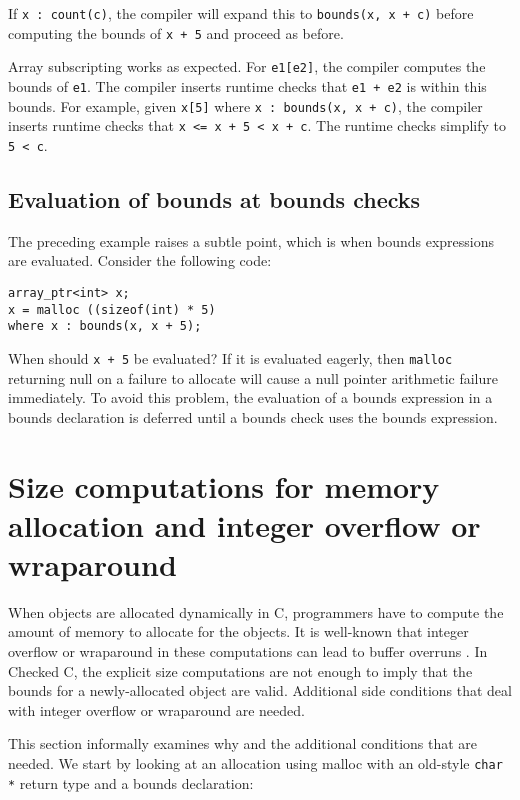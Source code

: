 If \verb|x : count(c)|, the compiler will expand this to
\verb|bounds(x, x + c)| before computing the bounds of \verb|x + 5|
and proceed as before.

Array subscripting works as expected. For \texttt{e1[e2]}, the
compiler computes the bounds of \texttt{e1}. The compiler inserts
runtime checks that \texttt{e1 + e2} is within this bounds. For example,
given \verb|x[5]| where \verb|x : bounds(x, x + c)|, the
compiler inserts runtime checks that \verb|x <= x + 5 < x + c|. 
The runtime checks simplify to \verb|5 < c|.

\subsection{Evaluation of bounds at bounds checks}

The preceding example raises a subtle point, which is when bounds
expressions are evaluated. Consider the following code:

\begin{verbatim}
array_ptr<int> x;
x = malloc ((sizeof(int) * 5)
where x : bounds(x, x + 5);
\end{verbatim}

When should \texttt{x + 5} be evaluated? If it is evaluated eagerly,
then \texttt{malloc} returning null on a failure to allocate will cause
a null pointer arithmetic failure immediately. To avoid this problem,
the evaluation of a bounds expression in a bounds declaration is
deferred until a bounds check uses the bounds expression.

\section{Size computations for memory allocation and integer overflow or wraparound}
\label{section:integer-overflow-informal}

When objects are allocated dynamically in C, programmers have to compute
the amount of memory to allocate for the objects. It is well-known 
\cite{Howard2003,Mitre2015-128,Mitre2015-190,Mitre2015-680} 
that integer overflow or wraparound in these computations can lead to buffer
overruns . In Checked C, the explicit size computations are not enough
to imply that the bounds for a newly-allocated object are valid.
Additional side conditions that deal with integer overflow or wraparound
are needed.

This section informally examines why and the additional conditions that
are needed. We start by looking at an allocation using malloc with an
old-style \texttt{char *} return type and a bounds declaration:

